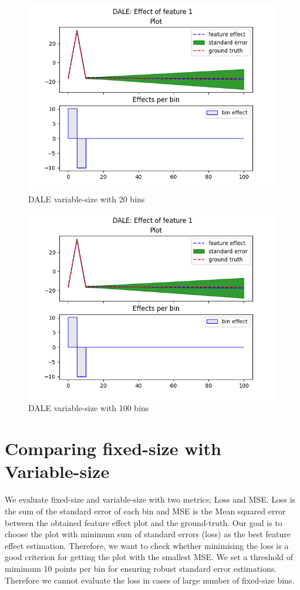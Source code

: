 \documentclass{article}
\begin{document}
\begin{figure}[!h]
\centering
\includegraphics[width=0.9\linewidth]{Figure_dale_var_20.png}
\caption{DALE variable-size with 20 bins}
\label{im:var-20}
\end{figure}

\begin{figure}[!h]
\centering
\includegraphics[width=0.9\linewidth]{Figure_dale_var_100.png}
\caption{DALE variable-size with 100 bins}
\label{im:var-100}
\end{figure}


\section{Comparing fixed-size with Variable-size}

We evaluate fixed-size and variable-size with two metrics; Loss and
MSE. Loss is the sum of the standard error of each bin and MSE is the
Mean squared error between the obtained feature effect plot and the
ground-truth. Our goal is to choose the plot with minimum sum of
standard errors (loss) as the best feature effect
estimation. Therefore, we want to check whether minimising the loss is
a good criterion for getting the plot with the smallest MSE. We set a
threshold of mimimum 10 points per bin for ensuring robust standard
error estimations. Therefore we cannot evaluate the loss in cases of
large number of fixed-size bins.
\end{document}
